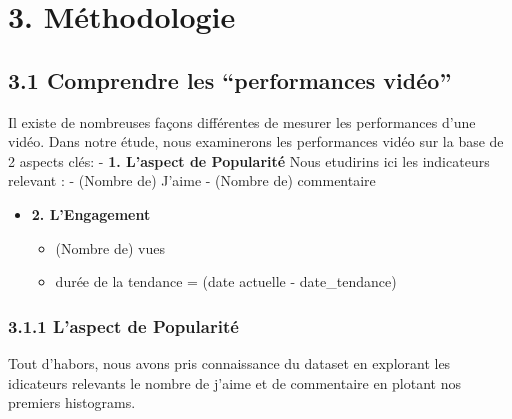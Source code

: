 \documentclass[11pt]{article}
\providecommand{\tightlist}{%
      \setlength{\itemsep}{0pt}\setlength{\parskip}{0pt}}
\begin{document}
    \hypertarget{muxe9thodologie}{%
\section{3. Méthodologie}\label{muxe9thodologie}}

\hypertarget{comprendre-les-performances-viduxe9o}{%
\subsection{3.1 Comprendre les ``performances
vidéo''}\label{comprendre-les-performances-viduxe9o}}

Il existe de nombreuses façons différentes de mesurer les performances
d'une vidéo. Dans notre étude, nous examinerons les performances vidéo
sur la base de 2 aspects clés: - \textbf{1. L'aspect de Popularité} Nous
etudirins ici les indicateurs relevant : - (Nombre de) J'aime - (Nombre
de) commentaire

\begin{itemize}
\tightlist
\item
  \textbf{2. L'Engagement}

  \begin{itemize}
  \tightlist
  \item
    (Nombre de) vues
  \item
    durée de la tendance = (date actuelle - date\_tendance)
  \end{itemize}
\end{itemize}

    \hypertarget{laspect-de-popularituxe9}{%
\subsubsection{3.1.1 L'aspect de
Popularité}\label{laspect-de-popularituxe9}}

Tout d'habors, nous avons pris connaissance du dataset en explorant les
idicateurs relevants le nombre de j'aime et de commentaire en plotant
nos premiers histograms.
\end{document}

